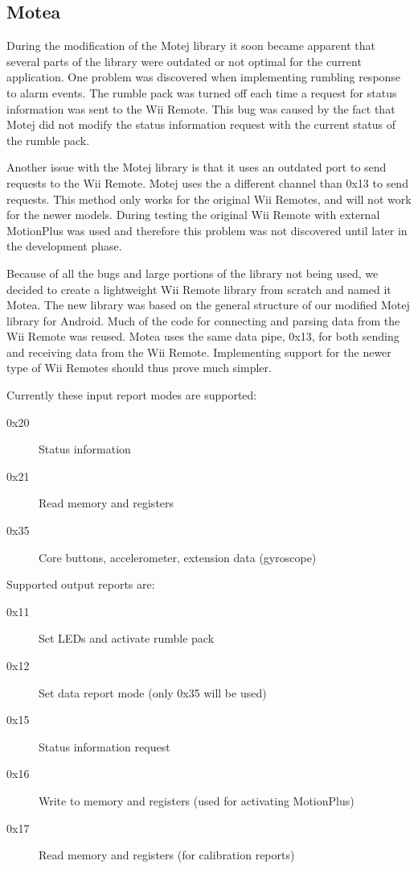 \subsection{Motea}
\label{sec:motea}
During the modification of the Motej library it soon became apparent that several parts of the library were outdated or not optimal for the current application. One problem was discovered when implementing rumbling response to alarm events. The rumble pack was turned off each time a request for status information was sent to the Wii Remote. This bug was caused by the fact that Motej did not modify the status information request with the current status of the rumble pack.

Another issue with the Motej library is that it uses an outdated port to send requests to the Wii Remote. Motej uses the a different channel than 0x13 to send requests. This method only works for the original Wii Remotes, and will not work for the newer models. During testing the original Wii Remote with external MotionPlus was used and therefore this problem was not discovered until later in the development phase.

Because of all the bugs and large portions of the library not being used, we decided to create a lightweight Wii Remote library from scratch and named it Motea. The new library was based on the general structure of our modified Motej library for Android. Much of the code for connecting and parsing data from the Wii Remote was reused. Motea uses the same data pipe, 0x13, for both sending and receiving data from the Wii Remote. Implementing support for the newer type of Wii Remotes should thus prove much simpler.

Currently these input report modes are supported:
\begin{description}
	\item[0x20] Status information
	\item[0x21] Read memory and registers
	\item[0x35] Core buttons, accelerometer, extension data (gyroscope)
\end{description}

Supported output reports are:
\begin{description}
	\item[0x11] Set LEDs and activate rumble pack
	\item[0x12] Set data report mode (only 0x35 will be used)
	\item[0x15] Status information request
	\item[0x16] Write to memory and registers (used for activating MotionPlus)
	\item[0x17] Read memory and registers (for calibration reports)
\end{description}

